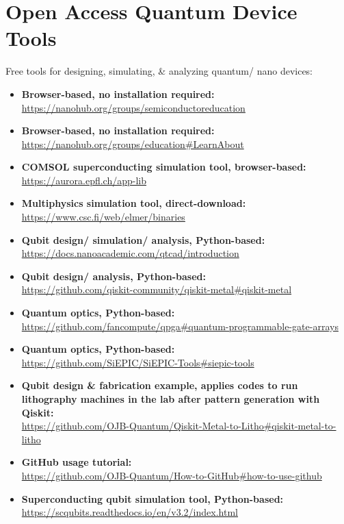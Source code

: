 \chapter{\LARGE Open Access Quantum Device Tools}

\begin{flushleft}
\large Free tools for designing, simulating, \& analyzing quantum/ nano devices:
\end{flushleft}

\normalsize\begin{itemize}

  \item\textbf{Browser-based, no installation required:}\\
\url{https://nanohub.org/groups/semiconductoreducation}
  \item\textbf{Browser-based, no installation required:}\\
\url{https://nanohub.org/groups/education#LearnAbout}
  \item\textbf{COMSOL superconducting simulation tool, browser-based:}\\
\url{https://aurora.epfl.ch/app-lib}
  \item\textbf{Multiphysics simulation tool, direct-download:}\\
\url{https://www.csc.fi/web/elmer/binaries}
  \item\textbf{Qubit design/ simulation/ analysis, Python-based:}\\
\url{https://docs.nanoacademic.com/qtcad/introduction}
  \item\textbf{Qubit design/ analysis, Python-based:}\\
\url{https://github.com/qiskit-community/qiskit-metal#qiskit-metal}
  \item\textbf{Quantum optics, Python-based:}\\
\url{https://github.com/fancompute/qpga#quantum-programmable-gate-arrays}
  \item\textbf{Quantum optics, Python-based:}\\
\url{https://github.com/SiEPIC/SiEPIC-Tools#siepic-tools}
  \item\textbf{Qubit design \& fabrication example, applies codes to run lithography machines in the lab after pattern generation with Qiskit:}\\
\url{https://github.com/OJB-Quantum/Qiskit-Metal-to-Litho#qiskit-metal-to-litho}
  \item\textbf{GitHub usage tutorial:}\\
\url{https://github.com/OJB-Quantum/How-to-GitHub#how-to-use-github}
  \item\textbf{Superconducting qubit simulation tool, Python-based:}\\
\url{https://scqubits.readthedocs.io/en/v3.2/index.html}\\

\end{itemize}